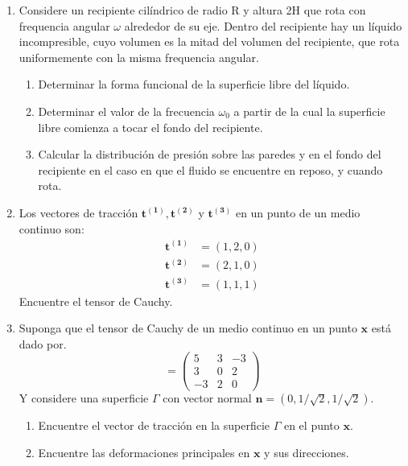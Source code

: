 \documentclass[12pt,a4paper]{article}
\begin{document}
\begin{enumerate}
\begin{figure}[h]
    \end{figure}
    \item Considere un recipiente cilíndrico de radio R y altura 2H
    que rota con frequencia angular $\omega$
    alrededor de su eje. Dentro del recipiente hay un líquido incompresible,
    cuyo volumen es la mitad del volumen del recipiente, que rota uniformemente con la
    misma frequencia angular.
    \begin{enumerate}
        \item Determinar la forma funcional de la superficie libre del líquido.
        \item Determinar el valor de la frecuencia $\omega_0$
        a partir de la cual la superficie libre
        comienza a tocar el fondo del recipiente.
        \item Calcular la distribución de presión sobre las paredes y en el fondo del recipiente
        en el caso en que el fluido se encuentre en reposo, y cuando rota.
    \end{enumerate}
    \item Los vectores de tracción $\mathbf{t^{(1)}, t^{(2)}}$ y $\mathbf{t^{(3)}}$ en un punto de un medio continuo son:   
    \begin{align}
        \mathbf{t^{(1)}} &= (1,2,0) \\
        \mathbf{t^{(2)}} &= (2,1,0) \\
        \mathbf{t^{(3)}} &= (1,1,1)
    \end{align} 
    Encuentre el tensor de Cauchy.
    \item Suponga que el tensor de Cauchy de un medio continuo en un punto $\mathbf{x}$ está dado por.
    \begin{equation}
        [\sigma]=\begin{pmatrix}
            5 & 3 & -3\\
            3 & 0 & 2\\
            -3 & 2 & 0
            \end{pmatrix}
    \end{equation}
    Y considere una superficie $\Gamma$ con vector normal $\mathbf{n}=(0,1/\sqrt{2},1/\sqrt{2})$.
    \begin{enumerate}
        \item Encuentre el vector de tracción en la superficie $\Gamma$ en el punto $\mathbf{x}$.
        \item Encuentre las deformaciones principales en $\mathbf{x}$ y sus direcciones.
    \end{enumerate}
\end{enumerate}
\end{document}
